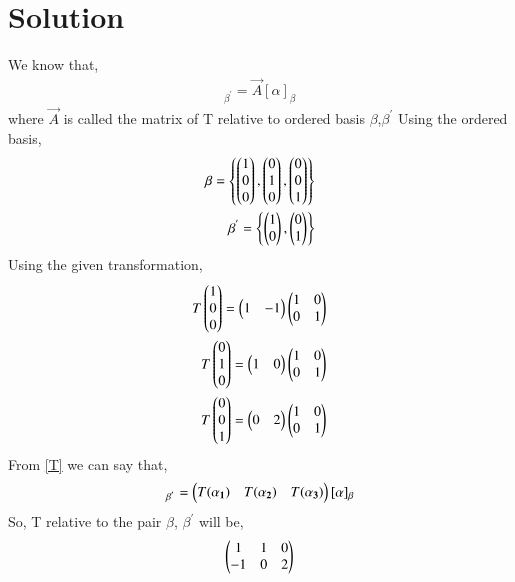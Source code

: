 \documentclass[journal,12pt,twocolumn]{IEEEtran}
\begin{document}
\section{\textbf{Solution}}
We know that,
\begin{align}
[T\alpha]_{\beta^{'}}=\vec{A}[\alpha]_{\beta}\label{T}
\end{align}
where $\vec{A}$ is called the matrix of T relative to ordered basis $\beta$,$\beta^{'}$
Using the ordered basis,
\begin{align}
\beta=\left\{\begin{pmatrix}1\\0\\0\end{pmatrix},\begin{pmatrix}0\\1\\0\end{pmatrix},\begin{pmatrix}0\\0\\1\end{pmatrix}\right\}\\
\beta^{'}=\left\{\begin{pmatrix}1\\0\end{pmatrix},\begin{pmatrix}0\\1\end{pmatrix}\right\}
\end{align}
Using the given transformation,
\begin{align}
T\begin{pmatrix}1\\0\\0\end{pmatrix}=\begin{pmatrix}1&-1\end{pmatrix}\begin{pmatrix}1&0\\0&1\end{pmatrix}\\
T\begin{pmatrix}0\\1\\0\end{pmatrix}=\begin{pmatrix}1&0\end{pmatrix}\begin{pmatrix}1&0\\0&1\end{pmatrix}\\
T\begin{pmatrix}0\\0\\1\end{pmatrix}=\begin{pmatrix}0&2\end{pmatrix}\begin{pmatrix}1&0\\0&1\end{pmatrix}
\end{align}
From \eqref{T} we can say that,
\begin{align}
[T\vec{\alpha}]_{\beta^{'}}=\myvec{T(\vec{\alpha_1})&T(\vec{\alpha_2})&T(\vec{\alpha_3})}[\vec{\alpha}]_{\beta}
\end{align}
So, T relative to the pair $\beta$, $\beta^{'}$ will be,
\begin{align}
\begin{pmatrix}1&1&0\\-1&0&2\end{pmatrix}
\end{align}
\end{document}
